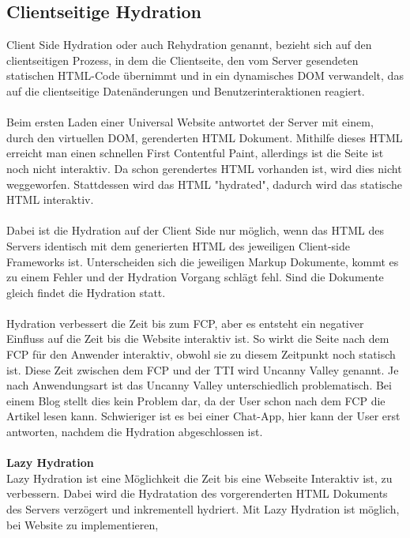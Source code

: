 \documentclass[runningheads]{llncs}
\begin{document}
\subsection{Clientseitige Hydration}
\label{subsec:Clientseitige Hydration}
Client Side Hydration oder auch Rehydration genannt, 
bezieht sich auf den clientseitigen Prozess, 
in dem die Clientseite, 
den vom Server gesendeten statischen HTML-Code übernimmt und 
in ein dynamisches DOM verwandelt, 
das auf die clientseitige Datenänderungen und Benutzerinteraktionen reagiert. 
\\
\\
Beim ersten Laden einer Universal Website antwortet der Server mit einem, 
durch den virtuellen DOM, gerenderten HTML Dokument. 
Mithilfe dieses HTML erreicht man einen schnellen First Contentful Paint, 
allerdings ist die Seite ist noch nicht interaktiv. 
Da schon gerendertes HTML vorhanden ist, 
wird dies nicht weggeworfen. Stattdessen wird das HTML "hydrated", 
dadurch wird das statische HTML interaktiv. 
\\
\\
Dabei ist die Hydration auf der Client Side nur möglich, 
wenn das HTML des Servers identisch mit dem generierten HTML des jeweiligen 
Client-side Frameworks ist. 
Unterscheiden sich die jeweiligen Markup Dokumente, 
kommt es zu einem Fehler und der Hydration Vorgang schlägt fehl. 
Sind die Dokumente gleich findet die Hydration statt.
\\
\\
Hydration verbessert die Zeit bis zum FCP, 
aber es entsteht ein negativer Einfluss auf die Zeit bis die Website interaktiv ist. 
So wirkt die Seite nach dem FCP für den Anwender interaktiv, 
obwohl sie zu diesem Zeitpunkt noch statisch ist. 
Diese Zeit zwischen dem FCP und der TTI wird Uncanny Valley genannt. 
Je nach Anwendungsart ist das Uncanny Valley unterschiedlich problematisch. 
Bei einem Blog stellt dies kein Problem dar, 
da der User schon nach dem FCP die Artikel lesen kann. 
Schwieriger ist es bei einer Chat-App, 
hier kann der User erst antworten, 
nachdem die Hydration abgeschlossen ist. \cite{vue.jsserver-sideguide} \cite{arunoda}
\\
\\
\textbf{Lazy Hydration}
\\
Lazy Hydration ist eine Möglichkeit die Zeit bis eine Webseite Interaktiv ist, 
zu verbessern. Dabei wird die Hydratation des vorgerenderten HTML Dokuments des Servers verzögert und 
inkrementell hydriert. Mit Lazy Hydration ist möglich, 
bei Website zu implementieren, 
\end{document}
